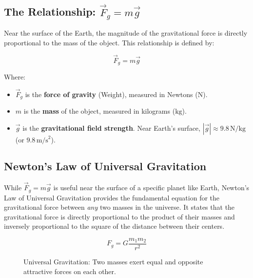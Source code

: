 \documentclass{article}
\begin{document}
\subsection{The Relationship: $\vec{F}_g = m\vec{g}$}
Near the surface of the Earth, the magnitude of the gravitational force is directly proportional to the mass of the object. This relationship is defined by:

\begin{equation}
\vec{F}_g = m\vec{g}
\end{equation}

Where:
\begin{itemize}
    \item $\vec{F}_g$ is the \textbf{force of gravity} (Weight), measured in Newtons ($\text{N}$).
    \item $m$ is the \textbf{mass} of the object, measured in kilograms ($\text{kg}$).
    \item $\vec{g}$ is the \textbf{gravitational field strength}. Near Earth's surface, $|\vec{g}| \approx 9.8\,\text{N/kg}$ (or $9.8\,\text{m/s}^2$).
\end{itemize}

\subsection{Newton's Law of Universal Gravitation}
While $\vec{F}_g = m\vec{g}$ is useful near the surface of a specific planet like Earth, Newton's Law of Universal Gravitation provides the fundamental equation for the gravitational force between \emph{any} two masses in the universe. It states that the gravitational force is directly proportional to the product of their masses and inversely proportional to the square of the distance between their centers.

\begin{equation}
F_g = G \frac{m_1 m_2}{r^2}
\end{equation}

\begin{figure}[h]
    \centering
    \caption{Universal Gravitation: Two masses exert equal and opposite attractive forces on each other.}
\end{figure}
\end{document}
